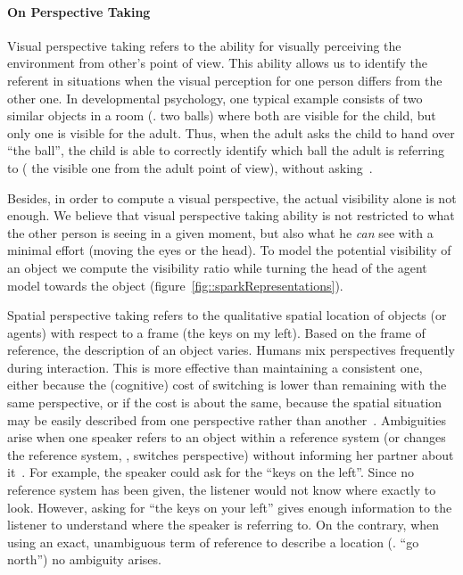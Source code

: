\paragraph{On Perspective Taking} Visual perspective taking refers to the
ability for visually perceiving the environment from other's point of view.
This ability allows us to identify the referent in situations when the visual
perception for one person differs from the other one. In developmental
psychology, one typical example consists of two similar objects in a room (\eg.
two balls) where both are visible for the child, but only one is  visible for
the adult. Thus, when the adult asks the child to hand over ``the ball'', the
child is able to correctly identify which ball the adult is referring to (\ie
the visible one from the adult point of view), without asking~\cite{Moll2006}.

Besides, in order to compute a visual perspective, the actual visibility alone
is not enough. We believe that visual perspective taking ability is not
restricted to what the other person is seeing in a given moment, but also what
he \emph{can} see with a minimal effort (moving the eyes or the head). To model
the potential visibility of an object we compute the visibility ratio while
turning the head of the agent model towards the object
(figure~\ref{fig::sparkRepresentations}).

Spatial perspective taking refers to the qualitative spatial location of
objects (or agents) with respect to a frame (\eg the keys on my left).  Based
on the frame of reference, the description of an object varies. Humans mix
perspectives frequently during interaction.  This is more effective than
maintaining a consistent one, either because the (cognitive) cost of switching
is lower than remaining with the same perspective, or if the cost is about the
same, because the spatial situation may be easily described from one
perspective rather than another~\cite{Tversky1999}. Ambiguities arise when one
speaker refers to an object within a reference system (or changes the reference
system, \ie, switches perspective) without informing her partner about
it~\cite{Breazeal2006, Ros2010}. For example, the speaker could ask for the
``keys on the left''. Since no reference system has been given, the listener
would not know where exactly to look.  However, asking for ``the keys on your
left'' gives enough information to the listener to understand where the speaker
is referring to. On the contrary, when using an exact, unambiguous term of
reference to describe a location (\eg. ``go north'') no ambiguity arises.

